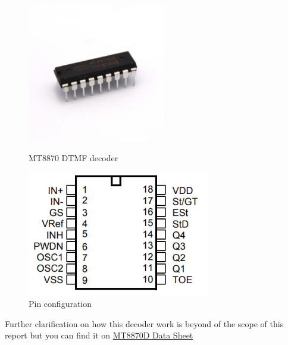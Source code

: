 \documentclass[a4paper]{article}
\begin{document}
\begin{figure}[h!]
\centering
\includegraphics[width=6cm]{images/dtmf_decoder.jpg}
\caption*{MT8870 DTMF decoder}
\includegraphics[width=8cm]{images/decoder_pins.PNG}
\caption*{Pin configuration}
\end{figure}
\newpage
\noindent
Further clarification on how this decoder work is beyond of the scope of this report but you can find it on \href{https://www.microsemi.com/document-portal/doc_view/127041-mt8870d-datasheet-oct2006}{MT8870D Data Sheet}
\end{document}
